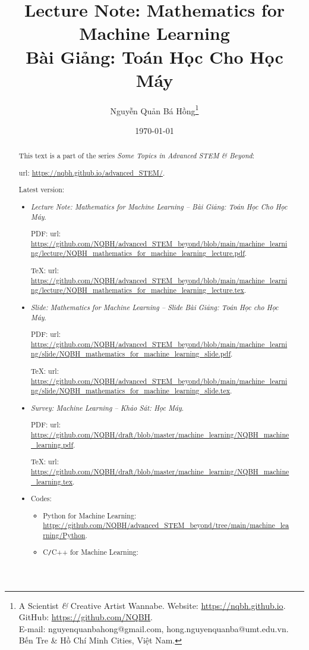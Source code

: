 \documentclass{article}
\title{Lecture Note: Mathematics for Machine Learning\\Bài Giảng: Toán Học Cho Học Máy}
\author{Nguyễn Quản Bá Hồng\footnote{A Scientist {\it\&} Creative Artist Wannabe. Website: \url{https://nqbh.github.io}. GitHub: \url{https://github.com/NQBH}.\\E-mail: {\sf nguyenquanbahong@gmail.com, hong.nguyenquanba@umt.edu.vn}. Bến Tre \& Hồ Chí Minh Cities, Việt Nam.}}
\date{\today}
\begin{document}
\maketitle
\begin{abstract}
	This text is a part of the series {\it Some Topics in Advanced STEM \& Beyond}:
	
	{\sc url}: \url{https://nqbh.github.io/advanced_STEM/}.
	
	Latest version:
	\begin{itemize}
		\item {\it Lecture Note: Mathematics for Machine Learning -- Bài Giảng: Toán Học Cho Học Máy}.
		
		PDF: {\sc url}: \url{https://github.com/NQBH/advanced_STEM_beyond/blob/main/machine_learning/lecture/NQBH_mathematics_for_machine_learning_lecture.pdf}.
		
		\TeX: {\sc url}: \url{https://github.com/NQBH/advanced_STEM_beyond/blob/main/machine_learning/lecture/NQBH_mathematics_for_machine_learning_lecture.tex}.
		\item {\it Slide: Mathematics for Machine Learning -- Slide Bài Giảng: Toán Học cho Học Máy}.
		
		PDF: {\sc url}: \url{https://github.com/NQBH/advanced_STEM_beyond/blob/main/machine_learning/slide/NQBH_mathematics_for_machine_learning_slide.pdf}.
		
		\TeX: {\sc url}: \url{https://github.com/NQBH/advanced_STEM_beyond/blob/main/machine_learning/slide/NQBH_mathematics_for_machine_learning_slide.tex}.
		\item {\it Survey: Machine Learning -- Khảo Sát: Học Máy}.
		
		PDF: {\sc url}: \url{https://github.com/NQBH/draft/blob/master/machine_learning/NQBH_machine_learning.pdf}.
		
		\TeX: {\sc url}: \url{https://github.com/NQBH/draft/blob/master/machine_learning/NQBH_machine_learning.tex}.
		\item Codes:
		\begin{itemize}
			\item Python for Machine Learning: \url{https://github.com/NQBH/advanced_STEM_beyond/tree/main/machine_learning/Python}.
			\item C{\tt/}C++ for Machine Learning:
		\end{itemize}
	\end{itemize}
\end{abstract}
\tableofcontents

\end{document}
